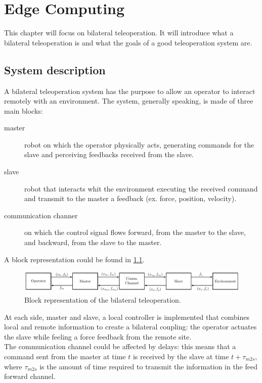 \chapter{Edge Computing} 
This chapter will focus on bilateral teleoperation.
It will introduce what a bilateral teleoperation is and what the goals of a good teleoperation system are.

 \section{System description}
A bilateral teleoperation system has the purpose to allow an operator to interact remotely with an environment. The system, generally speaking, is made of three main blocks: 
\begin{description}
	\item[master] robot on which the operator physically acts, generating commands for the slave and perceiving feedbacks received from the slave. 
	\item[slave] robot that interacts whit the environment executing the received command and transmit to the master a feedback (ex. force, position, velocity).
	\item[communication channer] on which the control signal flows forward, from the master to the slave, and backward, from the slave to the master.
\end{description}
A block representation could be found in \figurename{\ref{sch:bilateral_teleop}}.\\
\begin{figure}
	\includegraphics[width=\textwidth]{schemas/Bilateral_Teleop.pdf}
	\caption[Block representation of the bilateral teleoperation]{Block representation of the bilateral teleoperation.}
	\label{sch:bilateral_teleop}
\end{figure}
At each side, master and slave, a local controller is implemented that combines local and remote information to create a bilateral coupling: the operator actuates the slave while feeling a force feedback from the remote site.\\
The communication channel could be affected by delays: this means that a command sent from the master at time $t$ is received by the slave at time $t + \tau_{m2s}$, where $\tau_{m2s}$ is the amount of time required to transmit the information in the feed forward channel.\\
